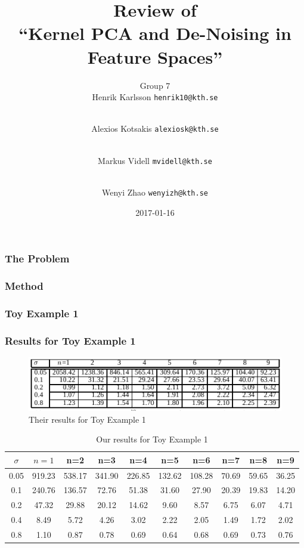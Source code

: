 \documentclass{beamer}
\title{\small{Review of\\``Kernel PCA and De-Noising in Feature Spaces''}}
\author{
    Group 7\\
    Henrik Karlsson \texttt{henrik10@kth.se} \and \\
    Alexios Kotsakis \texttt{alexiosk@kth.se}\and \\
    Markus Videll \texttt{mvidell@kth.se}\and \\
    Wenyi Zhao \texttt{wenyizh@kth.se}\and
}
\institute{KTH}
\date{2017-01-16}
\begin{document}
\begin{frame}
    \titlepage
\end{frame}

\begin{frame}
    \frametitle{The Problem}

\end{frame}


\begin{frame}
    \frametitle{Method}
\end{frame}


\begin{frame}
    \frametitle{Toy Example 1}

\end{frame}

\begin{frame}
    \frametitle{Results for Toy Example 1}
    \begin{figure}
        \includegraphics[width=\textwidth]{images/paper-toy1}
        \caption*{Their results for Toy Example 1}
    \end{figure}

    \begin{table}
        \begin{adjustbox}{width=\textwidth}
        \begin{tabular}{c|ccccccccc}
            $\sigma$ & $n=1$ & n=2 & n=3 & n=4 & n=5 & n=6 & n=7 & n=8 & n=9\\
        \hline 0.05 & 919.23 & 538.17 & 341.90 & 226.85 & 132.62 & 108.28 &
        70.69 & 59.65 & 36.25 \\ 0.1 & 240.76 & 136.57 &  72.76 &  51.38 &
        31.60 & 27.90 & 20.39 & 19.83 & 14.20 \\ 0.2 &  47.32 &  29.88 &
        20.12 &  14.62 & 9.60 &   8.57 &  6.75 & 6.07 &  4.71 \\ 0.4 &   8.49
        &   5.72 &   4.26 &   3.02 & 2.22 & 2.05 &  1.49 &  1.72 &  2.02 \\
        0.8 &   1.10 &   0.87 &   0.78 & 0.69 &   0.64 &   0.68 &  0.69 &
            0.73 &  0.76 \\ \hline
        \end{tabular}
        \end{adjustbox}
        \caption*{Our results for Toy Example 1}
    \end{table}
\end{frame}
\end{document}
